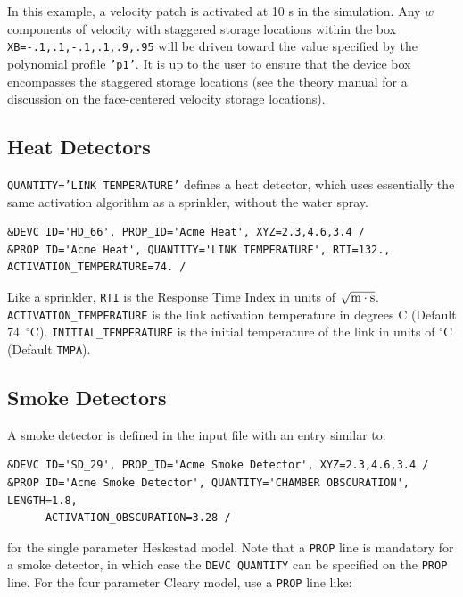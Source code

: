 \documentclass[11pt]{book}
\newcommand{\ct}{\tt\small}
\begin{document}
\normalsize
\noindent
In this example, a velocity patch is activated at 10 s in the simulation.  Any $w$ components of velocity with staggered storage locations within the box {\ct XB=-.1,.1,-.1,.1,.9,.95} will be driven toward the value specified by the polynomial profile {\ct 'p1'}.  It is up to the user to ensure that the device box encompasses the staggered storage locations (see the theory manual \cite{FDS_Math_Guide} for a discussion on the face-centered velocity storage locations).

\subsection{Heat Detectors}
\label{info:heat_detectors}

{\ct QUANTITY='LINK TEMPERATURE'} defines a heat detector, which uses essentially the same activation algorithm as a sprinkler, without the water spray.

\footnotesize
\begin{verbatim}
&DEVC ID='HD_66', PROP_ID='Acme Heat', XYZ=2.3,4.6,3.4 /
&PROP ID='Acme Heat', QUANTITY='LINK TEMPERATURE', RTI=132., ACTIVATION_TEMPERATURE=74. /
\end{verbatim}

\normalsize
\noindent
Like a sprinkler, {\ct RTI} is the Response Time Index in units of
$\sqrt{\hbox{m}\cdot \hbox{s}}$.
{\ct ACTIVATION\_TEMPERATURE} is the link activation temperature in degrees C (Default 74~$^\circ$C).
{\ct INITIAL\_TEMPERATURE} is the initial temperature of the link in units of $^\circ$C (Default {\ct TMPA}).



\subsection{Smoke Detectors}
\label{info:smoke_detector}

A smoke detector is defined in the input file with an entry similar to:

\footnotesize
\begin{verbatim}
&DEVC ID='SD_29', PROP_ID='Acme Smoke Detector', XYZ=2.3,4.6,3.4 /
&PROP ID='Acme Smoke Detector', QUANTITY='CHAMBER OBSCURATION', LENGTH=1.8,
      ACTIVATION_OBSCURATION=3.28 /
\end{verbatim}

\normalsize
\noindent
for the single parameter Heskestad model. Note that a {\ct PROP} line is mandatory for a smoke detector, in which case the
{\ct DEVC QUANTITY} can be specified on the {\ct PROP} line. For the four parameter Cleary model, use a {\ct PROP} line like:
\end{document}
